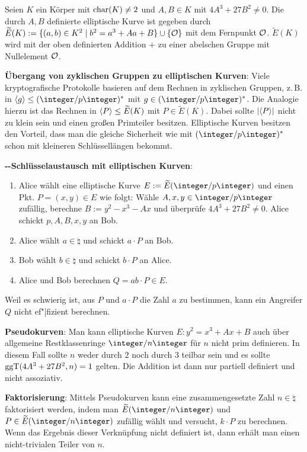 Seien $K$ ein Körper mit $\operatorname{char}(K) \not= 2$ und $A, B \in K$ mit $4A^3 + 27B^2 \not= 0$.
Die durch $A, B$ definierte elliptische Kurve ist gegeben durch
$\widetilde{E}(K) := \{(a, b) \in K^2 \;|\; b^2 = a^3 + Aa + B\} \cup \{\mathcal{O}\}$
mit dem Fernpunkt $\mathcal{O}$.
$\widetilde{E}(K)$ wird mit der oben definierten
Addition $+$ zu einer abelschen Gruppe mit Nullelement $\mathcal{O}$.

\textbf{Übergang von zyklischen Gruppen zu elliptischen Kurven}:
Viele kryptografische Protokolle basieren auf dem Rechnen in zyklischen Gruppen,
z.\,B. in $\erzeugnis{g} \le (\ZpZ)^\ast$ mit $g \in (\ZpZ)^\ast$.
Die Analogie hierzu ist das Rechnen in $\langle P\rangle \le \widetilde{E}(K)$ mit
$P \in \widetilde{E}(K)$.
Dabei sollte $|\langle P\rangle|$ nicht zu klein sein und einen großen Primteiler besitzen.
Elliptische Kurven besitzen den Vorteil, dass man die gleiche Sicherheit wie mit $(\ZpZ)^\ast$
schon mit kleineren Schlüssellängen bekommt.

\linie

\textbf{--Schlüsselaustausch mit elliptischen Kurven}:
\begin{enumerate}
    \item
    Alice wählt eine elliptische Kurve $E := \widetilde{E}(\ZpZ)$ und einen Pkt.
    $P = (x, y) \in E$ wie folgt:
    Wähle $A, x, y \in \ZpZ$ zufällig, berechne $B := y^2 - x^3 - Ax$ und überprüfe
    $4A^3 + 27B^2 \not= 0$.
    Alice schickt $p, A, B, x, y$ an Bob.

    \item
    Alice wählt $a \in \natural$ und schickt $a \cdot P$ an Bob.

    \item
    Bob wählt $b \in \natural$ und schickt $b \cdot P$ an Alice.

    \item
    Alice und Bob berechnen $Q = ab \cdot P \in E$.
\end{enumerate}
Weil es schwierig ist, aus $P$ und $a \cdot P$ die Zahl $a$ zu bestimmen, kann ein Angreifer
$Q$ nicht ef"|fizient berechnen.

\linie

\textbf{Pseudokurven}:
Man kann elliptische Kurven $E\colon y^2 = x^3 + Ax + B$
auch über allgemeine Restklassenringe $\ZnZ$ für $n$ nicht prim definieren.
In diesem Fall sollte $n$ weder durch $2$ noch durch $3$ teilbar sein und
es sollte $\operatorname{ggT}(4A^3 + 27B^2, n) = 1$ gelten.
Die Addition ist dann nur partiell definiert und nicht assoziativ.

\linie

\textbf{Faktorisierung}:
Mittels Pseudokurven kann eine zusammengesetzte Zahl $n \in \natural$ faktorisiert werden,
indem man $\widetilde{E}(\ZnZ)$ und $P \in \widetilde{E}(\ZnZ)$ zufällig wählt und
versucht, $k \cdot P$ zu berechnen.
Wenn das Ergebnis dieser Verknüpfung nicht definiert ist, dann erhält man einen nicht-trivialen
Teiler von $n$.

\pagebreak
